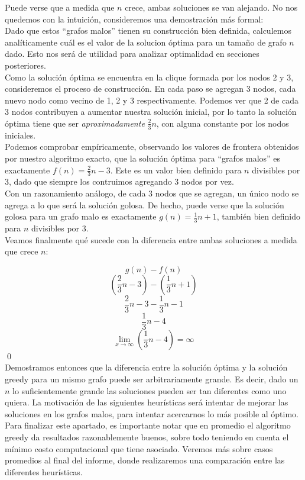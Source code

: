 Puede verse que a medida que $n$ crece, ambas soluciones se van alejando. No nos quedemos con la intuición, consideremos una demostración más formal: \\

Dado que estos ``grafos malos'' tienen su construcción bien definida, calculemos analíticamente cuál es el valor de la solucion óptima para un tamaño de grafo $n$ dado. Esto nos será de utilidad para analizar optimalidad en secciones posteriores. \\

Como la solución óptima se encuentra en la clique formada por los nodos 2 y 3, consideremos el proceso de construcción. En cada paso se agregan 3 nodos, cada nuevo nodo como vecino de 1, 2 y 3 respectivamente. Podemos ver que 2 de cada 3 nodos contribuyen a aumentar nuestra solución inicial, por lo tanto la solución óptima tiene que ser \textit{aproximadamente} $\frac{2}{3}n$, con alguna constante por los nodos iniciales. \\

Podemos comprobar empíricamente, observando los valores de frontera obtenidos por nuestro algoritmo exacto, que la solución óptima para ``grafos malos'' es exactamente $f(n) = \frac{2}{3}n - 3$. Este es un valor bien definido para $n$ divisibles por 3, dado que siempre los contruimos agregando 3 nodos por vez. \\

Con un razonamiento análogo, de cada 3 nodos que se agregan, un único nodo se agrega a lo que será la solución golosa. De hecho, puede verse que la solución golosa para un grafo malo es exactamente $g(n) = \frac{1}{3}n + 1$, también bien definido para $n$ divisibles por 3. \\

Veamos finalmente qué sucede con la diferencia entre ambas soluciones a medida que crece $n$:

$$g(n) - f(n)$$
$$(\frac{2}{3}n - 3) - (\frac{1}{3}n + 1)$$
$$\frac{2}{3}n - 3 - \frac{1}{3}n - 1$$
$$\frac{1}{3}n - 4$$
\[ \lim_{x \to \infty} (\frac{1}{3}n - 4) = \infty \] \qed \\

Demostramos entonces que la diferencia entre la solución óptima y la solución greedy para un mismo grafo puede ser arbitrariamente grande. Es decir, dado un $n$ lo suficientemente grande las soluciones pueden ser tan diferentes como uno quiera. La motivación de las siguientes heurísticas será intentar de mejorar las soluciones en los grafos malos, para intentar acercarnos lo más posible al óptimo. \\

Para finalizar este apartado, es importante notar que en promedio el algoritmo greedy da resultados razonablemente buenos, sobre todo teniendo en cuenta el mínimo costo computacional que tiene asociado. Veremos más sobre casos promedios al final del informe, donde realizaremos una comparación entre las diferentes heurísticas. \\

